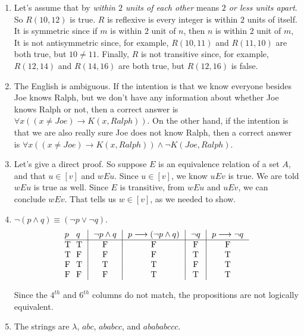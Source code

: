 \begin{enumerate}
\item Let's assume that by {\it within $2$ units of each other} means {\it $2$ or less units apart}. So $R(10,12)$ 
is true.  $R$ is reflexive is every integer is within $2$ units of itself. It is symmetric since if $m$ is within $2$ unit of 
$n$, then $n$ is within $2$ unit of $m$, It is not antisymmetric since, for example, $R(10,11)$ and 
$R(11,10)$ are both true, but $10\not=11$. Finally,  $R$ is not transitive since, for example, $R(12,14)$ and 
$R(14,16)$ are both true, but $R(12,16)$ is false.

\medskip


\item  The English is ambiguous. If the intention is that we know everyone besides Joe knows Ralph, but we don't have any information about whether Joe knows Ralph or not, then a correct answer is $\forall{x}( (x\not= Joe) \longrightarrow K(x,Ralph))$. On the other hand, if the intention is that we are also really sure Joe does not know Ralph, then a correct answer is
$\forall{x}( (x\not= Joe) \longrightarrow K(x,Ralph)) \land \lnot K(Joe,Ralph)$.

\medskip


\item  Let's give a direct proof. So suppose  $E$ is an equivalence relation of a set $A$, and  that $u\in [v]$ and $wEu$. Since $u\in [v]$, we know $uEv$ is true. We are told $wEu$ is true as well. Since $E$ is transitive, from $wEu$ and $uEv$, we can conclude $wEv$. That tells us $w\in [v]$, as we needed to show.

\medskip


\item {} $\neg(p\wedge q)\equiv (\neg p \vee \neg q)$.
$$\vbox{\offinterlineskip
\halign { \strut # & # & \vrule ~~# & \vrule ~~# & \vrule ~~# & \vrule ~~# \cr
$p$ & $q$ & $\neg p\land q$ & $p\longrightarrow(\neg p\land q)$  & $\neg q$ & $p \longrightarrow\neg q$ \cr
\noalign{\hrule}
T   &  T   &  F  &  F & F & F  \cr
T   &  F   &  F  &  F & T & T  \cr
F   &  T   &  T  &  T & F & T  \cr
F   &  F   &  F  &  T & T & T  \cr
}}$$

Since the $4^{th}$ and $6^{th}$ columns do not match, the propositions are not logically equivalent.

\medskip


\item The strings are $\lambda$, $abc$, $ababcc$, and $abababccc$.

\medskip


\end{enumerate}
